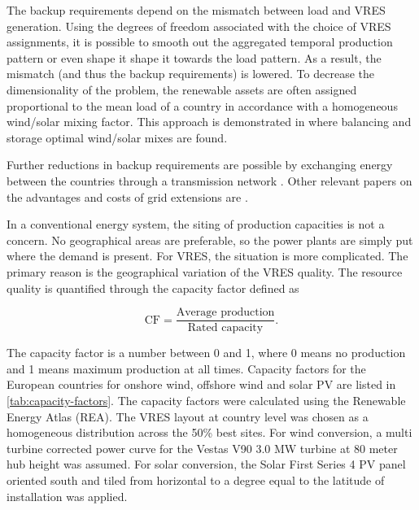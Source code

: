 \documentclass[a4paper, 5p, sort&compress]{elsarticle}%
\begin{document}
The backup requirements depend on the mismatch between load and VRES
generation. Using the degrees of freedom associated with the choice of
VRES assignments, it is possible to smooth out the aggregated temporal
production pattern or even shape it shape it towards the load
pattern. As a result, the mismatch (and thus the backup requirements)
is lowered.  To decrease the dimensionality of the problem, the
renewable assets are often assigned proportional to the mean load of a
country in accordance with a homogeneous wind/solar mixing
factor. This approach is demonstrated in
\cite{Heide2010,Heide2011} where balancing and storage optimal
wind/solar mixes are found.

Further reductions in backup requirements are possible by exchanging
energy between the countries through a transmission network
\cite{rolando2014,sarah}. Other relevant papers on the advantages and
costs of grid extensions are \cite{Schaber, Schaber2}.


In a conventional energy system, the siting of production capacities
is not a concern. No geographical areas are preferable, so the power
plants are simply put where the demand is present. For VRES, the
situation is more complicated. The primary reason is the geographical
variation of the VRES
quality. %
The resource quality is quantified through the capacity factor defined as

\begin{equation}
  \label{eq:1}
  \mbox{CF} = \frac{\mbox{Average production}}{\mbox{Rated capacity}} .
\end{equation}

The capacity factor is a number between 0 and 1, where 0 means no
production and 1 means maximum production at all times. Capacity
factors for the European countries for onshore wind, offshore wind and
solar PV are listed in \cref{tab:capacity-factors}. The capacity
factors were calculated using the Renewable Energy Atlas \cite{REA}
(REA). The VRES layout at country level was chosen as a homogeneous
distribution across the 50\% best sites. For wind conversion, a multi
turbine corrected power curve for the Vestas V90 3.0 MW turbine at 80
meter hub height was assumed. For solar conversion, the Solar First
Series 4 PV panel oriented south and tiled from horizontal to a
degree equal to the latitude of installation was applied.
\end{document}
